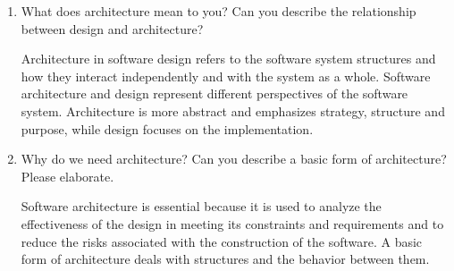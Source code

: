 \documentclass[12pt]{article}
\begin{document}
\begin{enumerate}
\begin{enumerate}[start=1,align=left]
      \item What does architecture mean to you? Can you describe the relationship between design and architecture?

      Architecture in software design refers to the software system structures and how they interact independently and with the system as a whole. Software architecture and design represent different perspectives of the software system. Architecture is more abstract and emphasizes strategy, structure and purpose, while design focuses on the implementation.

      \item Why do we need architecture? Can you describe a basic form of architecture? Please elaborate.

      Software architecture is essential because it is used to analyze the effectiveness of the design in meeting its constraints and requirements and to reduce the risks associated with the construction of the software. A basic form of architecture deals with structures and the behavior between them.

    \end{enumerate}






\end{enumerate}
\end{document}

